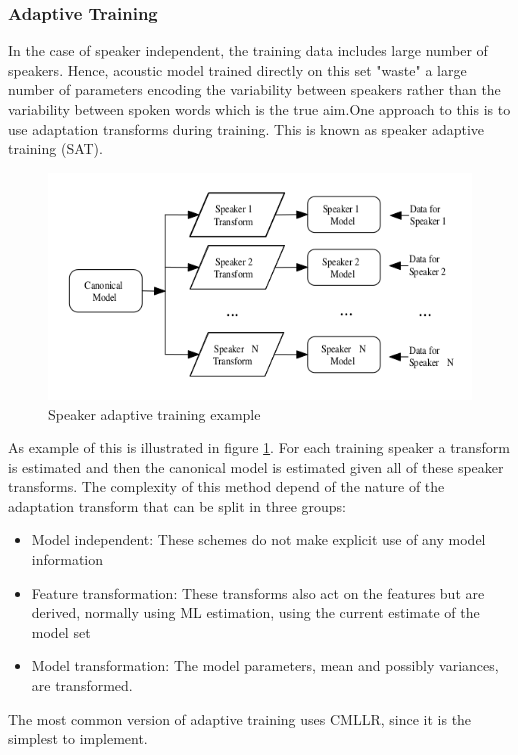 \subsubsection{Adaptive Training}\label{at}
In the case of speaker independent, the training data includes large number of speakers. Hence, acoustic model trained directly on this set "waste" a large number of parameters encoding the variability between speakers rather than the variability between spoken words which is the true aim.One approach to this is to use adaptation transforms during training. This is known as speaker adaptive training (SAT).
\begin{figure} [!htb]
	\begin{center}
	\includegraphics[width=1\textwidth]{img/sat2.png}
	\end{center}
	\caption{\label{satimg}Speaker adaptive training example}
\end{figure}
As example of this is illustrated in figure \ref{satimg}. For each training speaker a transform is estimated and then the canonical model is estimated given all of these speaker transforms. The complexity of this method depend of the nature of the adaptation transform that can be split in three groups:
\begin{itemize}
	\item Model independent: These schemes do not make explicit use of any model information
	\item Feature transformation: These transforms also act on the features but are derived, normally using ML estimation, using the current estimate of the model set
	\item Model transformation: The model parameters, mean and possibly variances, are transformed.
\end{itemize}
The most common version of adaptive training uses CMLLR, since it is the simplest to implement.
